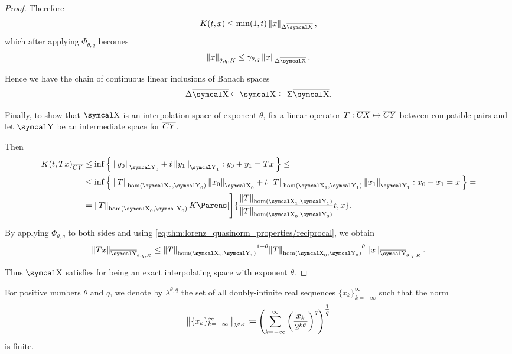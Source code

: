 \begin{proof}
  Therefore
  \begin{equation*}
    K(t, x) \leq \min(1, t) \Norm{x}_{\Delta \Ol{\CX}},
  \end{equation*}
  which after applying \( \Phi_{\theta,q} \) becomes
  \begin{equation*}
    \Norm{x}_{\theta,q,K} \leq \gamma_{\theta,q} \Norm{x}_{\Delta \Ol{\CX}}.
  \end{equation*}

  Hence we have the chain of continuous linear inclusions of Banach spaces
  \begin{equation*}
    \Delta \Ol{\CX} \subseteq \CX \subseteq \Sigma \Ol{\CX}.
  \end{equation*}

  Finally, to show that \( \CX \) is an interpolation space of exponent \( \theta \), fix a linear operator \( T: \overline{CX} \mapsto \overline{CY} \) between compatible pairs and let \( \CY \) be an intermediate space for \( \overline{CY} \).

  Then
  \begin{align*}
    K(t, Tx)_{\Ol{CY}}
    &\leq
    \inf \Set{ \Norm{y_0}_{\CY_0} + t \Norm{y_1}_{\CY_1} : y_0 + y_1 = Tx }
    \leq \\ &\leq
    \inf \Set{ \Norm{T}_{\hom(\CX_0, \CY_0)} \Norm{x_0}_{\CX_0} + t \Norm{T}_{\hom(\CX_1, \CY_1)} \Norm{x_1}_{\CY_1} : x_0 + x_1 = x }
    = \\ &=
    \Norm{T}_{\hom(\CX_0, \CY_0)} K\Parens[\Bigg]{\frac {\Norm{T}_{\hom(\CX_1, \CY_1)}} {\Norm{T}_{\hom(\CX_0, \CY_0)}} t, x}.
  \end{align*}

  By applying \( \Phi_{\theta,q} \) to both sides and using \eqref{eq:thm:lorenz_quasinorm_properties/reciprocal}, we obtain
  \begin{equation*}
    \Norm{Tx}_{\Ol{\CY}_{\theta,q,K}}
    \leq
    {\Norm{T}_{\hom(\CX_1, \CY_1)}}^{1 - \theta} {\Norm{T}_{\hom(\CX_0, \CY_0)}}^{\theta} \Norm{x}_{\Ol{\CY}_{\theta,q,K}}.
  \end{equation*}

  Thus \( \CX \) satisfies  for being an exact interpolating space with exponent \( \theta \).
\end{proof}

\begin{definition}\label{def:discrete_k_interpolation_space}
  For positive numbers \( \theta \) and \( q \), we denote by \( \lambda^{\theta,q} \) the set of all doubly-infinite real sequences \( \{ x_k \}_{k=-\infty}^\infty \) such that the norm
  \begin{equation}\label{def:discrete_k_interpolation_space}
    \left\Vert \{ x_k \}_{k=-\infty}^\infty \right\Vert_{\lambda^{\theta,q}} \coloneqq \left( \sum_{k=-\infty}^\infty \left( \frac {\left\vert x_k \right\vert} {2^{k\theta}} \right)^q \right)^{\tfrac 1 q}
  \end{equation}
  is finite.
\end{definition}

